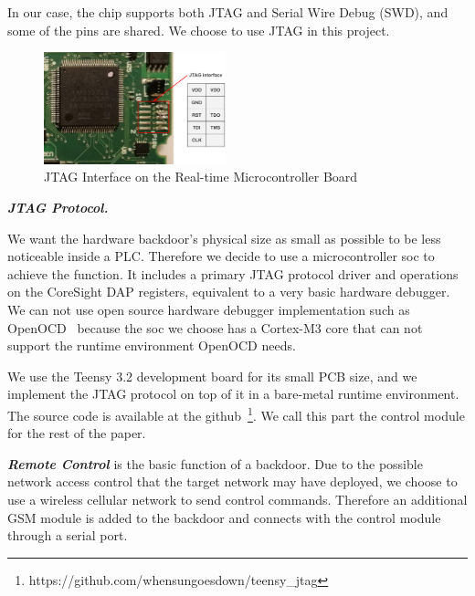 In our case, the chip supports both JTAG and Serial Wire Debug (SWD)\cite{ashfieldserial}, and some of the pins are shared. We choose to use JTAG in this project.

\begin{figure}[th]
	\includegraphics[width=0.47\textwidth]{figures/board_jtag}
	\centering
	\caption{JTAG Interface on the Real-time Microcontroller Board}
	\label{fig:board_jtag}
\end{figure}


\textbf{\textit{JTAG Protocol.}}

We want the hardware backdoor's physical size as small as possible to be less noticeable inside a PLC. Therefore we decide to use a microcontroller soc to achieve the function. It includes a primary JTAG protocol driver and operations on the CoreSight DAP registers, equivalent to a very basic hardware debugger. We can not use open source hardware debugger implementation such as OpenOCD~\cite{hogl2006open} because the soc we choose has a Cortex-M3 core that can not support the runtime environment OpenOCD needs.

We use the Teensy 3.2 development board for its small PCB size, and we implement the JTAG protocol on top of it in a bare-metal runtime environment. The source code is available at the github~\footnote{https://github.com/whensungoesdown/teensy\_jtag}. We call this part the control module for the rest of the paper. 


\textbf{\textit{Remote Control}} is the basic function of a backdoor. Due to the possible network access control that the target network may have deployed, we choose to use a wireless cellular network to send control commands. Therefore an additional GSM module is added to the backdoor and connects with the control module through a serial port.
